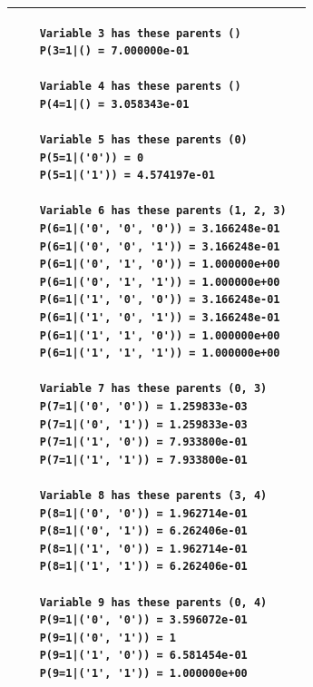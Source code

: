 \documentclass{article}
\begin{document}
\begin{center}
\begin{tabular}{|p{7cm}|p{7cm}|}
\begin{verbatim}
	Variable 3 has these parents ()
	P(3=1|() = 7.000000e-01 
	
	Variable 4 has these parents ()
	P(4=1|() = 3.058343e-01 
	
	Variable 5 has these parents (0)
	P(5=1|('0')) = 0 
	P(5=1|('1')) = 4.574197e-01 
	
	Variable 6 has these parents (1, 2, 3)
	P(6=1|('0', '0', '0')) = 3.166248e-01 
	P(6=1|('0', '0', '1')) = 3.166248e-01 
	P(6=1|('0', '1', '0')) = 1.000000e+00 
	P(6=1|('0', '1', '1')) = 1.000000e+00 
	P(6=1|('1', '0', '0')) = 3.166248e-01 
	P(6=1|('1', '0', '1')) = 3.166248e-01 
	P(6=1|('1', '1', '0')) = 1.000000e+00 
	P(6=1|('1', '1', '1')) = 1.000000e+00 
	
	Variable 7 has these parents (0, 3)
	P(7=1|('0', '0')) = 1.259833e-03 
	P(7=1|('0', '1')) = 1.259833e-03 
	P(7=1|('1', '0')) = 7.933800e-01 
	P(7=1|('1', '1')) = 7.933800e-01 
	
	Variable 8 has these parents (3, 4)
	P(8=1|('0', '0')) = 1.962714e-01 
	P(8=1|('0', '1')) = 6.262406e-01 
	P(8=1|('1', '0')) = 1.962714e-01 
	P(8=1|('1', '1')) = 6.262406e-01 
	
	Variable 9 has these parents (0, 4)
	P(9=1|('0', '0')) = 3.596072e-01 
	P(9=1|('0', '1')) = 1 
	P(9=1|('1', '0')) = 6.581454e-01 
	P(9=1|('1', '1')) = 1.000000e+00 
	\end{verbatim}\\ 
	\hline
\end{tabular} 
\end{center}
\end{document}
